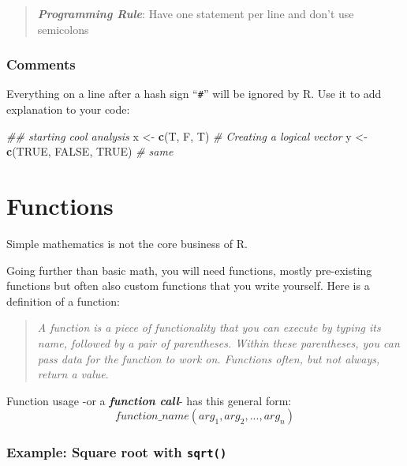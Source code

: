 \documentclass[]{book}
\newenvironment{Shaded}{\begin{snugshade}}{\end{snugshade}}
\newcommand{\CommentTok}[1]{\textcolor[rgb]{0.56,0.35,0.01}{\textit{#1}}}
\newcommand{\KeywordTok}[1]{\textcolor[rgb]{0.13,0.29,0.53}{\textbf{#1}}}
\newcommand{\NormalTok}[1]{#1}
\newcommand{\OtherTok}[1]{\textcolor[rgb]{0.56,0.35,0.01}{#1}}
\newcommand{\StringTok}[1]{\textcolor[rgb]{0.31,0.60,0.02}{#1}}
\begin{document}
\begin{quote}
\textbf{\emph{Programming Rule}}: Have one statement per line and don't use semicolons
\end{quote}

\hypertarget{comments}{%
\subsubsection*{Comments}\label{comments}}

Everything on a line after a hash sign ``\texttt{\#}'' will be ignored by R. Use it to add explanation to your code:

\begin{Shaded}
\begin{Highlighting}[]
\CommentTok{## starting cool analysis}
\NormalTok{x <-}\StringTok{ }\KeywordTok{c}\NormalTok{(T, F, T) }\CommentTok{# Creating a logical vector}
\NormalTok{y <-}\StringTok{ }\KeywordTok{c}\NormalTok{(}\OtherTok{TRUE}\NormalTok{, }\OtherTok{FALSE}\NormalTok{, }\OtherTok{TRUE}\NormalTok{) }\CommentTok{# same}
\end{Highlighting}
\end{Shaded}

\hypertarget{functions}{%
\section{Functions}\label{functions}}

Simple mathematics is not the core business of R.

Going further than basic math, you will need functions, mostly pre-existing functions but often also custom functions that you write yourself. Here is a definition of a function:

\begin{quote}
\emph{A function is a piece of functionality that you can execute by typing its name, followed by a pair of parentheses. Within these parentheses, you can pass data for the function to work on. Functions often, but not always, return a value}.
\end{quote}

Function usage -or a \textbf{\emph{function call}}- has this general form:
\[function\_name(arg_1, arg_2, ..., arg_n)\]

\hypertarget{example-square-root-with-sqrt}{%
\subsubsection*{\texorpdfstring{Example: Square root with \texttt{sqrt()}}{Example: Square root with sqrt()}}\label{example-square-root-with-sqrt}}
\end{document}
